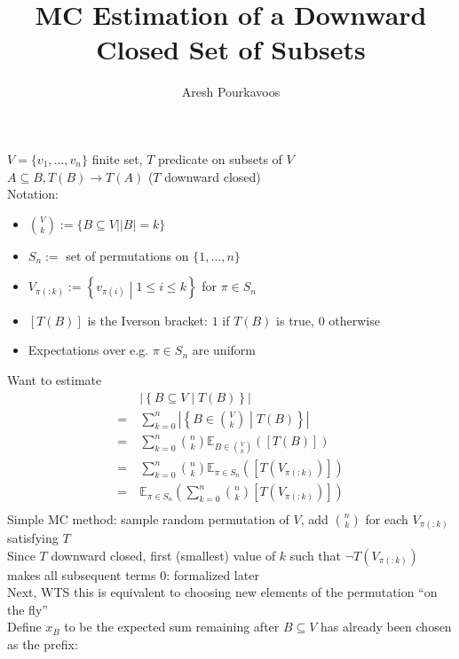 \documentclass{article}
\begin{document}
\title{MC Estimation of a Downward Closed Set of Subsets}
\author{Aresh Pourkavoos}
\maketitle

\newcommand{\E}{\mathbb{E}}
\newcommand{\abs}[1]{\left\vert #1 \right\vert}
\newcommand{\norm}[1]{\left\Vert #1 \right\Vert}

$V = \{v_1, \ldots, v_n\}$ finite set, $T$ predicate on subsets of $V$ \\
$A \subseteq B, T(B) \rightarrow T(A)$ ($T$ downward closed) \\
Notation:
\begin{itemize}
\item
  $\binom{V}{k} := \{B \subseteq V | \abs{B} = k\}$
\item
  $S_n := $ set of permutations on $\{1, \ldots, n\}$
\item
  $V_{\pi(:k)} := \left\{v_{\pi(i)} \middle| 1 \leq i \leq k\right\}$ for $\pi \in S_n$
\item
  $[T(B)]$ is the Iverson bracket: $1$ if $T(B)$ is true, $0$ otherwise
\item
  Expectations over e.g. $\pi \in S_n$ are uniform
\end{itemize}
Want to estimate
\begin{align*}
  &\abs{\left\{B \subseteq V \middle| T(B)\right\}} \\
  =\ &\sum_{k=0}^n\abs{\left\{B \in \binom{V}{k} \middle| T(B)\right\}} \\
  =\ &\sum_{k=0}^n\binom{n}{k}\E_{B \in \binom{V}{k}}([T(B)]) \\
  =\ &\sum_{k=0}^n\binom{n}{k}\E_{\pi \in S_n}\left(\left[T\left(V_{\pi(:k)}\right)\right]\right) \\
  =\ &\E_{\pi \in S_n}\left(\sum_{k=0}^n\binom{n}{k}\left[T\left(V_{\pi(:k)}\right)\right]\right) \\
\end{align*}
Simple MC method: sample random permutation of $V$, add $\binom{n}{k}$ for each $V_{\pi(:k)}$ satisfying $T$ \\
Since $T$ downward closed, first (smallest) value of $k$ such that $\lnot T(V_{\pi(:k)})$ makes all subsequent terms $0$: formalized later \\
Next, WTS this is equivalent to choosing new elements of the permutation ``on the fly'' \\
Define $x_B$ to be the expected sum remaining after $B \subseteq V$ has already been chosen as the prefix: \\
\end{document}
